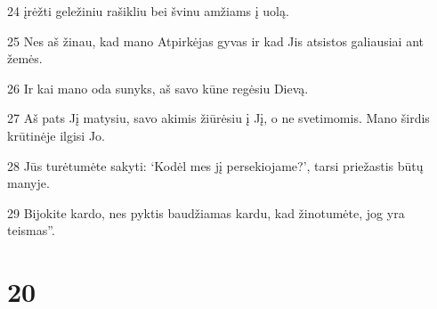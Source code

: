 \par 24 įrėžti geležiniu rašikliu bei švinu amžiams į uolą. 
\par 25 Nes aš žinau, kad mano Atpirkėjas gyvas ir kad Jis atsistos galiausiai ant žemės. 
\par 26 Ir kai mano oda sunyks, aš savo kūne regėsiu Dievą. 
\par 27 Aš pats Jį matysiu, savo akimis žiūrėsiu į Jį, o ne svetimomis. Mano širdis krūtinėje ilgisi Jo. 
\par 28 Jūs turėtumėte sakyti: ‘Kodėl mes jį persekiojame?’, tarsi priežastis būtų manyje. 
\par 29 Bijokite kardo, nes pyktis baudžiamas kardu, kad žinotumėte, jog yra teismas”.



\chapter{20}


